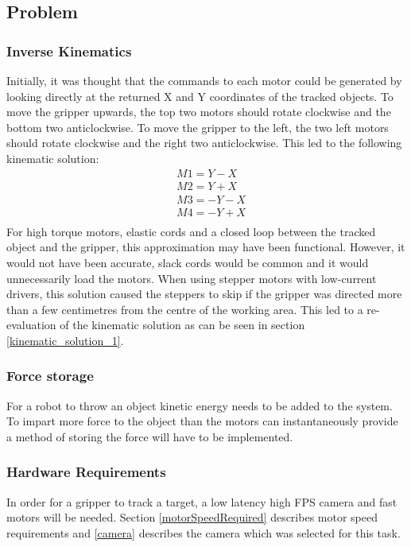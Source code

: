 \documentclass[conference]{IEEEtran}
\begin{document}
\subsection{Problem}
\subsubsection{Inverse Kinematics}\label{initial_kinematics}
Initially, it was thought that the commands to each motor could be generated by looking directly at the returned X and Y coordinates of the tracked objects. To move the gripper upwards, the top two motors should rotate clockwise and the bottom two anticlockwise. To move the gripper to the left, the two left motors should rotate clockwise and the right two anticlockwise. This led to the following kinematic solution:
\begin{equation}
\begin{aligned}
&M1 = Y - X \\
&M2 = Y + X\\
&M3 = -Y -X\\
&M4 = -Y + X\\
\end{aligned}
\end{equation}
For high torque motors, elastic cords and a closed loop between the tracked object and the gripper, this approximation may have been functional. However, it would not have been accurate, slack cords would be common and it would unnecessarily load the motors. When using stepper motors with low-current drivers, this solution caused the steppers to skip if the gripper was directed more than a few centimetres from the centre of the working area. 
This led to a re-evaluation of the kinematic solution as can be seen in section \ref{kinematic_solution_1}.

\subsubsection{Force storage} \label{force_problem}
For a robot to throw an object kinetic energy needs to be added to the system. To impart more force to the object than the motors can instantaneously provide a method of storing the force will have to be implemented.
\subsubsection{Hardware Requirements}
In order for a gripper to track a target, a low latency high FPS camera and fast motors will be needed. Section \ref{motorSpeedRequired} describes motor speed requirements and \ref{camera} describes the camera which was selected for this task.
\end{document}
